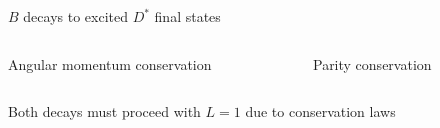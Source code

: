\documentclass[dvipsnames]{beamer}
\begin{document}
\begin{frame}{$B$ decays to excited $D^*$ final states}
\begin{figure}[H]
\begin{subfigure}{0.45\textwidth}
    \end{subfigure}
  \end{figure}
  \vspace{-0.5cm}
  \begin{columns}
    \begin{column}{0.5\textwidth}
      \begin{center}
        Angular momentum conservation
      \end{center}
    \end{column}
    \begin{column}{0.5\textwidth}
      \begin{center}
        Parity conservation
      \end{center}
    \end{column}
  \end{columns}
  \begin{center}
  {\large Both decays must proceed with \underline{$L = 1$} due to conservation laws}
  \end{center}
  \vspace{0.64cm}
\end{frame}
\end{document}
